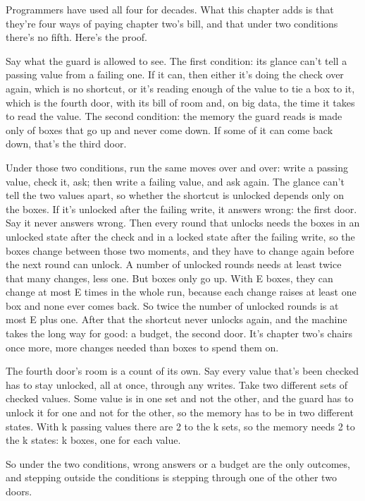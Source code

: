 \documentclass[11pt,twoside]{article}
\theoremstyle{thielethm}
\theoremstyle{thieledef}
\theoremstyle{thieledef}
\theoremstyle{thieledef}
\theoremstyle{thielethm}
\theoremstyle{thieleobs}
\theoremstyle{thielethm}
\begin{document}
Programmers have used all four for decades. What this chapter adds is that they're four ways of paying chapter two's bill, and that under two conditions there's no fifth. Here's the proof.

Say what the guard is allowed to see. The first condition: its glance can't tell a passing value from a failing one. If it can, then either it's doing the check over again, which is no shortcut, or it's reading enough of the value to tie a box to it, which is the fourth door, with its bill of room and, on big data, the time it takes to read the value. The second condition: the memory the guard reads is made only of boxes that go up and never come down. If some of it can come back down, that's the third door.

Under those two conditions, run the same moves over and over: write a passing value, check it, ask; then write a failing value, and ask again. The glance can't tell the two values apart, so whether the shortcut is unlocked depends only on the boxes. If it's unlocked after the failing write, it answers wrong: the first door. Say it never answers wrong. Then every round that unlocks needs the boxes in an unlocked state after the check and in a locked state after the failing write, so the boxes change between those two moments, and they have to change again before the next round can unlock. A number of unlocked rounds needs at least twice that many changes, less one. But boxes only go up. With E boxes, they can change at most E times in the whole run, because each change raises at least one box and none ever comes back. So twice the number of unlocked rounds is at most E plus one. After that the shortcut never unlocks again, and the machine takes the long way for good: a budget, the second door. It's chapter two's chairs once more, more changes needed than boxes to spend them on.

The fourth door's room is a count of its own. Say every value that's been checked has to stay unlocked, all at once, through any writes. Take two different sets of checked values. Some value is in one set and not the other, and the guard has to unlock it for one and not for the other, so the memory has to be in two different states. With k passing values there are 2 to the k sets, so the memory needs 2 to the k states: k boxes, one for each value.

So under the two conditions, wrong answers or a budget are the only outcomes, and stepping outside the conditions is stepping through one of the other two doors.
\end{document}
